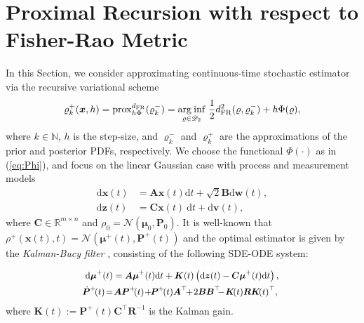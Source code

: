 \documentclass[letterpaper,10pt,twocolumn,conference]{ieeeconf}
\newcommand{\cD}{{\mathscr{D}}}
\newcommand{\bbv}{\bm{v}}
\newcommand{\bbw}{\bm{w}}
\newcommand{\bbx}{{\bm{x}}}
\newcommand{\bbz}{\bm{z}}
\newcommand{\bbmu}{\bm{\mu}}
\newcommand{\bbP}{{\bm{P}}}
\newcommand{\bbK}{\bm{K}}
\newcommand{\bbR}{\bm{R}}
\newcommand{\bbA}{\bm{A}}
\newcommand{\bbB}{\bm{B}}
\newcommand{\bbC}{\bm{C}}
\newcommand{\arginf}{\operatorname{arg\:inf}}
\newcommand{\dFR}{d_{\mathrm{FR}}}
\begin{document}

\section{Proximal Recursion with respect to Fisher-Rao Metric}\label{MainSection}
In this Section, we consider approximating continuous-time stochastic estimator via the recursive variational scheme
{\small{\begin{eqnarray}
\varrho_{k}^{+}(\bbx,h)= {\rm prox}_{h\Phi}^{\dFR}(\varrho_{k}^{-}) = \underset{\varrho\in\cD_{2}}{\arginf}\; \frac{1}{2}\dFR^2(\varrho,\varrho_{k}^{-}) + h\Phi(\varrho),
\label{ProxFR}	
\end{eqnarray}}}
\!\!\!where $k\in\mathbb{N}$, $h$ is the step-size, and $\varrho_{k}^{-}$ and $\varrho_{k}^{+}$ are the approximations of the prior and posterior PDFs, respectively. We choose the functional $\Phi(\cdot)$ as in (\ref{eq:Phi}), and focus on the linear Gaussian case with process and measurement models
\begin{subequations}
	\begin{align}
\mathrm{d}\bbx(t) &= \bbA\bbx(t)\mathrm{d}t + \sqrt{2}\bbB\mathrm{d}\bbw(t),\label{eq:LinDyn}\\
\mathrm{d}\bbz(t) &= \bbC\bm{x}(t)\:\mathrm{d}t + \mathrm{d}\bbv(t),\label{eq:LinMeas}
\end{align}
\end{subequations}
where $\bbC\in\mathbb{R}^{m\times n}$ and $\rho_{0} = \mathcal{N}(\bbmu_{0},\bbP_{0})$. It is well-known that $\rho^{+}(\bbx(t),t) = \mathcal{N}(\bbmu^{+}(t),\bbP^{+}(t))$ and the optimal estimator is given by the \emph{Kalman-Bucy filter} \cite{KalmanBucy1961}, consisting of the following SDE-ODE system:

\vspace*{-10pt}
\begin{subequations}
{\small{\begin{align}
&\mathrm{d}\bbmu^{+}(t) = \bbA\bbmu^{+}(t)\mathrm{d}t + \bbK(t)\left(\mathrm{d}\bbz(t) - \bbC\bbmu^{+}(t)\mathrm{d}t\right), \label{eq:KB1}\\
& \! \!\dot{\bbP}^{+} \!(t)  \!=  \!\bbA\bbP^{+} \!(t) \!+  \!\! \bbP^{+} \!(t)\bbA^{\top}  \! \!+ \! 2\bbB\bbB^{\top}    \!\!\!-  \!\bbK \!(t)\bbR\bbK \!(t)^{\top}, \label{eq:KB2}
\end{align}}}
\label{KB}
\end{subequations}
where $\bbK(t) := \bbP^{+}(t)\bbC^{\top}\bbR^{-1}$ is the Kalman gain.
\end{document}
